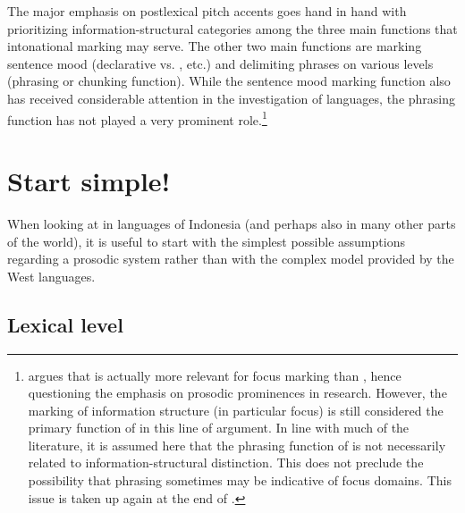 \documentclass[output=paper
,modfonts
,nonflat]{langsci/langscibook}
\begin{document}
The major emphasis on postlexical pitch accents goes hand in hand with prioritizing information-structural categories among the three main functions that intonational marking may serve. The other two main functions are marking sentence mood (declarative vs. , etc.) and delimiting phrases on various levels (phrasing or chunking function). While the sentence mood marking function also has received considerable attention in the investigation of  languages, the phrasing function has not played a very prominent role.\largerpage[1]\footnote{\citet{Féry2013} argues that  is actually more relevant for focus marking than , hence questioning the emphasis on prosodic prominences in  research. However, the marking of information structure (in particular focus) is still considered the primary function of  in this line of argument. In line with much of the literature, it is assumed here that the phrasing function of  is not necessarily related to information-structural distinction. This does not preclude the possibility that phrasing sometimes may be indicative of focus domains. This issue is taken up again at the end of .}

\section{\label{s:himmelmann:3}Start simple!} 

When looking at  in  languages of Indonesia (and perhaps also in many other parts of the world), it is useful to start with the simplest possible assumptions regarding a prosodic system rather than with the complex model provided by the West  languages. 

\subsection{\label{s:himmelmann:3.1}Lexical level}
\end{document}
